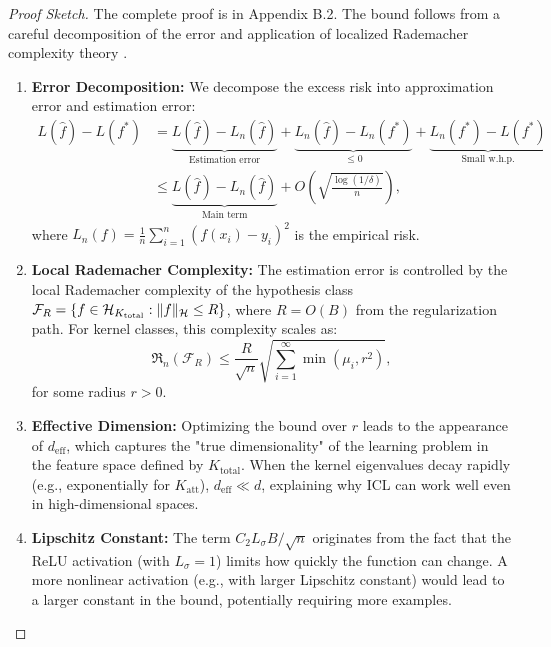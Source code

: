 	\begin{proof}[Proof Sketch]
		The complete proof is in Appendix B.2. The bound follows from a careful decomposition of the error and application of localized Rademacher complexity theory \citep{bartlett2005local}.
		\begin{enumerate}
			\item \textbf{Error Decomposition:} We decompose the excess risk into approximation error and estimation error:
			\begin{align}
				L(\hat{f}) - L(f^*) &= \underbrace{L(\hat{f}) - L_n(\hat{f})}_{\text{Estimation error}} + \underbrace{L_n(\hat{f}) - L_n(f^*)}_{\leq 0} + \underbrace{L_n(f^*) - L(f^*)}_{\text{Small w.h.p.}} \\
				&\leq \underbrace{L(\hat{f}) - L_n(\hat{f})}_{\text{Main term}} + O\left(\sqrt{\frac{\log(1/\delta)}{n}}\right),
			\end{align}
			where \(L_n(f) = \frac{1}{n}\sum_{i=1}^n (f(x_i) - y_i)^2\) is the empirical risk.
			
			\item \textbf{Local Rademacher Complexity:} The estimation error is controlled by the local Rademacher complexity of the hypothesis class \(\mathcal{F}_R = \{f \in \mathcal{H}_{K_{\text{total}}}: \lVert f \rVert_{\mathcal{H}} \leq R\}\), where \(R = O(B)\) from the regularization path. For kernel classes, this complexity scales as:
			\begin{equation}
				\mathfrak{R}_n(\mathcal{F}_R) \leq \frac{R}{\sqrt{n}} \sqrt{\sum_{i=1}^\infty \min(\mu_i, r^2)},
				\label{eq:rademacher}
			\end{equation}
			for some radius \(r > 0\).
			
			\item \textbf{Effective Dimension:} Optimizing the bound over \(r\) leads to the appearance of \(d_{\text{eff}}\), which captures the "true dimensionality" of the learning problem in the feature space defined by \(K_{\text{total}}\). When the kernel eigenvalues decay rapidly (e.g., exponentially for \(K_{\text{att}}\)), \(d_{\text{eff}} \ll d\), explaining why ICL can work well even in high-dimensional spaces.
			
			\item \textbf{Lipschitz Constant:} The term \(C_2 L_\sigma B / \sqrt{n}\) originates from the fact that the ReLU activation (with \(L_\sigma = 1\)) limits how quickly the function can change. A more nonlinear activation (e.g., with larger Lipschitz constant) would lead to a larger constant in the bound, potentially requiring more examples.
		\end{enumerate}
	\end{proof}
	
